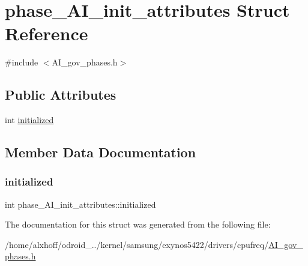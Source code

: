 \hypertarget{structphase__AI__init__attributes}{}\section{phase\+\_\+\+A\+I\+\_\+init\+\_\+attributes Struct Reference}
\label{structphase__AI__init__attributes}


{\ttfamily \#include $<$A\+I\+\_\+gov\+\_\+phases.\+h$>$}

\subsection*{Public Attributes}
\begin{DoxyCompactItemize}
\item 
int \hyperlink{structphase__AI__init__attributes_ac3c8c0bd3f71afeedc3ed470cb1284f2}{initialized}
\end{DoxyCompactItemize}


\subsection{Member Data Documentation}
\mbox{\label{structphase__AI__init__attributes_ac3c8c0bd3f71afeedc3ed470cb1284f2}} 
\subsubsection{\texorpdfstring{initialized}{initialized}}
{\footnotesize\ttfamily int phase\+\_\+\+A\+I\+\_\+init\+\_\+attributes\+::initialized}



The documentation for this struct was generated from the following file\+:\begin{DoxyCompactItemize}
\item 
/home/alxhoff/odroid\+\_../kernel/samsung/exynos5422/drivers/cpufreq/\hyperlink{AI__gov__phases_8h}{A\+I\+\_\+gov\+\_\+phases.\+h}\end{DoxyCompactItemize}
